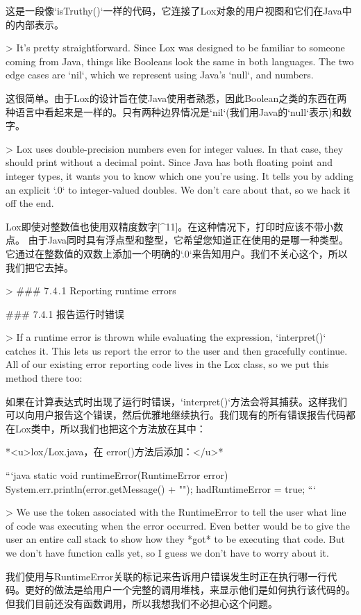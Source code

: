 \documentclass[cn,11pt,chinese]{elegantbook}
\begin{document}
{{{这是一段像`isTruthy()`一样的代码，它连接了Lox对象的用户视图和它们在Java中的内部表示。

> It’s pretty straightforward. Since Lox was designed to be familiar to someone coming from Java, things like Booleans look the same in both languages. The two edge cases are `nil`, which we represent using Java’s `null`, and numbers.

这很简单。由于Lox的设计旨在使Java使用者熟悉，因此Boolean之类的东西在两种语言中看起来是一样的。只有两种边界情况是`nil`(我们用Java的`null`表示)和数字。

> Lox uses double-precision numbers even for integer values. In that case, they should print without a decimal point. Since Java has both floating point and integer types, it wants you to know which one you’re using. It tells you by adding an explicit `.0` to integer-valued doubles. We don’t care about that, so we hack it off the end.

Lox即使对整数值也使用双精度数字[^11]。在这种情况下，打印时应该不带小数点。 由于Java同时具有浮点型和整型，它希望您知道正在使用的是哪一种类型。它通过在整数值的双数上添加一个明确的`.0`来告知用户。我们不关心这个，所以我们把它去掉。

> ### 7 . 4 . 1 Reporting runtime errors

### 7.4.1 报告运行时错误

> If a runtime error is thrown while evaluating the expression, `interpret()` catches it. This lets us report the error to the user and then gracefully continue. All of our existing error reporting code lives in the Lox class, so we put this method there too:

如果在计算表达式时出现了运行时错误，`interpret()`方法会将其捕获。这样我们可以向用户报告这个错误，然后优雅地继续执行。我们现有的所有错误报告代码都在Lox类中，所以我们也把这个方法放在其中：

*<u>lox/Lox.java，在 error()方法后添加：</u>*

```java
  static void runtimeError(RuntimeError error) {
    System.err.println(error.getMessage() +
        "");
    hadRuntimeError = true;
  }
```

> We use the token associated with the RuntimeError to tell the user what line of code was executing when the error occurred. Even better would be to give the user an entire call stack to show how they *got* to be executing that code. But we don’t have function calls yet, so I guess we don’t have to worry about it.

我们使用与RuntimeError关联的标记来告诉用户错误发生时正在执行哪一行代码。更好的做法是给用户一个完整的调用堆栈，来显示他们是如何执行该代码的。但我们目前还没有函数调用，所以我想我们不必担心这个问题。

}}}
\end{document}
